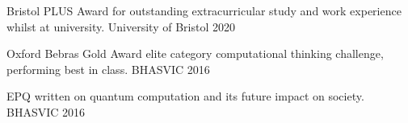 \vspace{-0.1cm}

\begin{cvhonors}

  \cvhonor
    {Bristol PLUS Award} %
    {for outstanding extracurricular study and work experience whilst at university.} %
    {University of Bristol} %
    {2020} %

  \cvhonor
    {Oxford Bebras Gold Award} %
    {elite category computational thinking challenge, performing best in class.} %
    {BHASVIC} %
    {2016} %

  \cvhonor
    {EPQ} %
    {written on quantum computation and its future impact on society.} %
    {BHASVIC} %
    {2016} %
    

\end{cvhonors}
